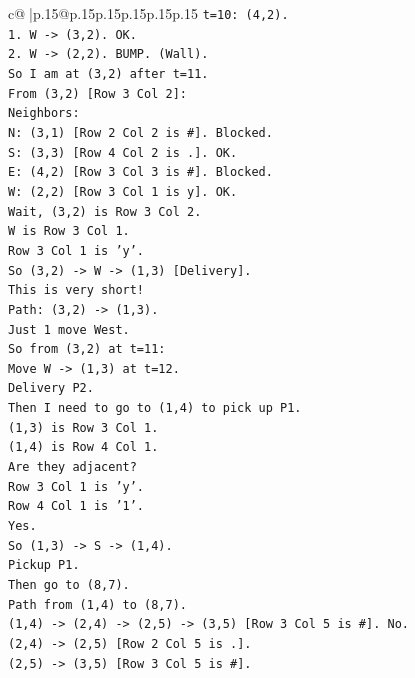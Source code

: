 \documentclass{article}
\begin{document}
{\begin{supertabular}{c@{$\;$}|p{.15\linewidth}@{}p{.15\linewidth}p{.15\linewidth}p{.15\linewidth}p{.15\linewidth}p{.15\linewidth}}
{{{\texttt{t=10: (4,2).} \\
\texttt{1. W {-}> (3,2). OK.} \\
\texttt{2. W {-}> (2,2). BUMP. (Wall).} \\
\texttt{So I am at (3,2) after t=11.} \\
\texttt{From (3,2) {[}Row 3 Col 2{]}:} \\
\texttt{Neighbors:} \\
\texttt{N: (3,1) {[}Row 2 Col 2 is \#{]}. Blocked.} \\
\texttt{S: (3,3) {[}Row 4 Col 2 is .{]}. OK.} \\
\texttt{E: (4,2) {[}Row 3 Col 3 is \#{]}. Blocked.} \\
\texttt{W: (2,2) {[}Row 3 Col 1 is y{]}. OK.} \\
\texttt{Wait, (3,2) is Row 3 Col 2.} \\
\texttt{W is Row 3 Col 1.} \\
\texttt{Row 3 Col 1 is 'y'.} \\
\texttt{So (3,2) {-}> W {-}> (1,3) {[}Delivery{]}.} \\
\texttt{This is very short!} \\
\texttt{Path: (3,2) {-}> (1,3).} \\
\texttt{Just 1 move West.} \\
\texttt{So from (3,2) at t=11:} \\
\texttt{Move W {-}> (1,3) at t=12.} \\
\texttt{Delivery P2.} \\
\texttt{Then I need to go to (1,4) to pick up P1.} \\
\texttt{(1,3) is Row 3 Col 1.} \\
\texttt{(1,4) is Row 4 Col 1.} \\
\texttt{Are they adjacent?} \\
\texttt{Row 3 Col 1 is 'y'.} \\
\texttt{Row 4 Col 1 is '1'.} \\
\texttt{Yes.} \\
\texttt{So (1,3) {-}> S {-}> (1,4).} \\
\texttt{Pickup P1.} \\
\texttt{Then go to (8,7).} \\
\texttt{Path from (1,4) to (8,7).} \\
\texttt{(1,4) {-}> (2,4) {-}> (2,5) {-}> (3,5) {[}Row 3 Col 5 is \#{]}. No.} \\
\texttt{(2,4) {-}> (2,5) {[}Row 2 Col 5 is .{]}.} \\
\texttt{(2,5) {-}> (3,5) {[}Row 3 Col 5 is \#{]}.} \\
}}}
\end{supertabular}}
\end{document}
